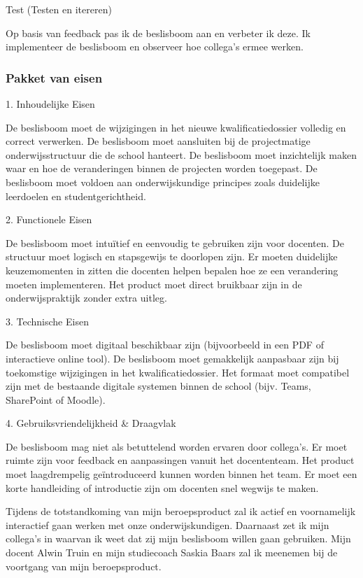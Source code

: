 Test (Testen en itereren)

    Op basis van feedback pas ik de beslisboom aan en verbeter ik deze.
    Ik implementeer de beslisboom en observeer hoe collega’s ermee werken.
\subsubsection{Pakket van eisen}    
1. Inhoudelijke Eisen

    De beslisboom moet de wijzigingen in het nieuwe kwalificatiedossier volledig en correct verwerken.
    De beslisboom moet aansluiten bij de projectmatige onderwijsstructuur die de school hanteert.
    De beslisboom moet inzichtelijk maken waar en hoe de veranderingen binnen de projecten worden toegepast.
    De beslisboom moet voldoen aan onderwijskundige principes zoals duidelijke leerdoelen en studentgerichtheid.

2. Functionele Eisen

    De beslisboom moet intuïtief en eenvoudig te gebruiken zijn voor docenten.
    De structuur moet logisch en stapsgewijs te doorlopen zijn.
    Er moeten duidelijke keuzemomenten in zitten die docenten helpen bepalen hoe ze een verandering moeten implementeren.
    Het product moet direct bruikbaar zijn in de onderwijspraktijk zonder extra uitleg.

3. Technische Eisen

    De beslisboom moet digitaal beschikbaar zijn (bijvoorbeeld in een PDF of interactieve online tool).
    De beslisboom moet gemakkelijk aanpasbaar zijn bij toekomstige wijzigingen in het kwalificatiedossier.
    Het formaat moet compatibel zijn met de bestaande digitale systemen binnen de school (bijv. Teams, SharePoint of Moodle).

4. Gebruiksvriendelijkheid & Draagvlak

    De beslisboom mag niet als betuttelend worden ervaren door collega’s.
    Er moet ruimte zijn voor feedback en aanpassingen vanuit het docententeam.
    Het product moet laagdrempelig geïntroduceerd kunnen worden binnen het team.
    Er moet een korte handleiding of introductie zijn om docenten snel wegwijs te maken.

Tijdens de totstandkoming van mijn beroepsproduct zal ik actief en voornamelijk interactief gaan werken met onze onderwijskundigen. Daarnaast zet ik mijn collega's in waarvan ik weet dat zij mijn beslisboom willen gaan gebruiken. Mijn docent Alwin Truin en mijn studiecoach Saskia Baars zal ik meenemen bij de voortgang van mijn beroepsproduct. 